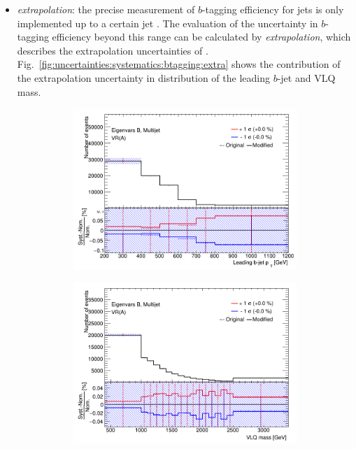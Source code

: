 \begin{itemize}
	\item \textit{extrapolation}: the precise measurement of $b$-tagging efficiency for jets is only implemented up to a certain jet \pt. The evaluation of the uncertainty in $b$-tagging efficiency beyond this \pt range can be calculated by \textit{extrapolation}, which describes the extrapolation uncertainties of \pt.~\cite{btagging:uncertainties} Fig.\ \ref{fig:uncertainties:systematics:btagging:extra} shows the contribution of the extrapolation uncertainty in \pt distribution of the leading $b$-jet and VLQ mass.
	\begin{figure}[hbt!]
		\centering
		\graphicspath{{figs/chapter6/Systematics/Extrapolation/}}
		\begin{subfigure}{.35\textwidth}
			\centering
			\includegraphics[width=\linewidth,height=\textheight,keepaspectratio]{VR_B_jet_pt_Multijets.png}
			\caption{}
			\label{fig:uncertainties:systematics:btagging:extra:jetpt}
		\end{subfigure}\hspace{0.6cm}
		\begin{subfigure}{.35\textwidth}
			\centering
			\includegraphics[width=\linewidth,height=\textheight,keepaspectratio]{VR_B_VLQM_Multijets.png}

\end{subfigure}
\end{figure}
\end{itemize}
